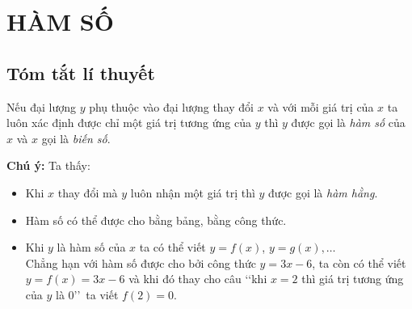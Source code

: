 \section{HÀM SỐ}
\subsection{Tóm tắt lí thuyết}
\begin{dn}
Nếu đại lượng $y$ phụ thuộc vào đại lượng thay đổi $x$ và với mỗi giá trị của $x$ ta luôn xác định được chỉ một giá trị tương ứng của $y$ thì $y$ được gọi là \textit{hàm số} của $x$ và $x$ gọi là \textit{biến số}.
\end{dn}
\begin{note}{\textbf{Chú ý:}}
Ta thấy:
\begin{itemize}
\item Khi $x$ thay đổi mà $y$ luôn nhận một giá trị thì $y$ được gọi là \textit{hàm hằng}.
\item Hàm số có thể được cho bằng bảng, bằng công thức.
\item Khi $y$ là hàm số của $x$ ta có thể viết $y=f(x)$, $y=g(x),\ldots $\\
Chẳng hạn với hàm số được cho bởi công thức $y=3x-6$, ta còn có thể viết $y=f(x)=3x-6$ và khi đó thay cho câu  \lq\lq khi $x=2$ thì giá trị tương ứng của $y$ là $0$\rq\rq\ ta viết $f(2)=0$.
\end{itemize}
\end{note}
